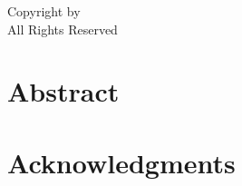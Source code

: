 

% 

% 

\pagestyle{empty}
\newpage
\vspace*{\fill}
\noindent \textcopyright Copyright by \Author {} \Year \\
All Rights Reserved

\cleardoublepage

\vspace{0.8in}
\section*{\center Abstract}


\cleardoublepage

\pagestyle{plain}
\section*{Acknowledgments}


